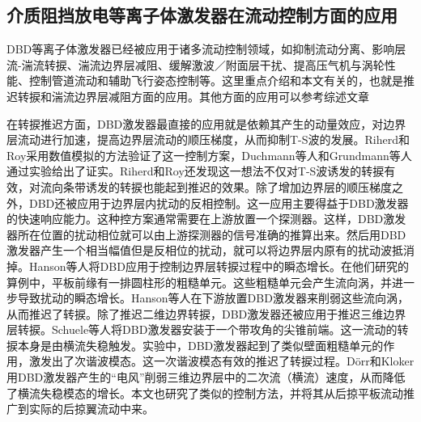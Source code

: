 \subsection{介质阻挡放电等离子体激发器在流动控制方面的应用}
DBD等离子体激发器已经被应用于诸多流动控制领域，如抑制流动分离\cite{Benard2016a,Sujar-Garrido2015,Benard2011,Benard2011a,Benard2016b,Little2010,Schneck2014,Jukes2009}、影响层流-湍流转捩\cite{Duchmann2014,Grundmann2007a,Grundmann2008,Kurz2014,Kotsonis2013,Hanson2010,Hanson2014}、湍流边界层减阻\cite{Jukes2006,Jukes2009,Mahfoze2017}、缓解激波／附面层干扰\cite{Im2012,Peschke2013}、提高压气机与涡轮性能\cite{huang2006,Ness2012}、控制管道流动\cite{Benard2008}和辅助飞行姿态控制\cite{He2009,Wei2013bang}等。这里重点介绍和本文有关的，也就是推迟转捩和湍流边界层减阻方面的应用。其他方面的应用可以参考综述文章\cite{Corke2010,wang2013Recent,wuyun2015}

在转捩推迟方面，DBD激发器最直接的应用就是依赖其产生的动量效应，对边界层流动进行加速，提高边界层流动的顺压梯度，从而抑制T-S波的发展。Riherd和Roy\cite{Riherd2013}采用数值模拟的方法验证了这一控制方案，Duchmann等人\cite{Duchmann2014,Grundmann2007a}和Grundmann等人\cite{Grundmann2007a}通过实验给出了证实。Riherd和Roy\cite{Riherd2014}还发现这一想法不仅对T-S波诱发的转捩有效，对流向条带诱发的转捩也能起到推迟的效果。除了增加边界层的顺压梯度之外，DBD还被应用于边界层内扰动的反相控制\cite{Grundmann2008,Kurz2014,Kotsonis2013,Simon2018}。这一应用主要得益于DBD激发器的快速响应能力。这种控方案通常需要在上游放置一个探测器。这样，DBD激发器所在位置的扰动相位就可以由上游探测器的信号准确的推算出来。然后用DBD激发器产生一个相当幅值但是反相位的扰动，就可以将边界层内原有的扰动波抵消掉。Hanson等人\cite{Hanson2010,Hanson2014}将DBD应用于控制边界层转捩过程中的瞬态增长。在他们研究的算例中，平板前缘有一排圆柱形的粗糙单元。这些粗糙单元会产生流向涡，并进一步导致扰动的瞬态增长。Hanson等人在下游放置DBD激发器来削弱这些流向涡，从而推迟了转捩。除了推迟二维边界转捩，DBD激发器还被应用于推迟三维边界层转捩。Schuele等人\cite{schuele2013control}将DBD激发器安装于一个带攻角的尖锥前端。这一流动的转捩本身是由横流失稳触发。实验中，DBD激发器起到了类似壁面粗糙单元的作用，激发出了次谐波模态。这一次谐波模态有效的推迟了转捩过程。D\"orr和Kloker\cite{dorr2016}用DBD激发器产生的“电风”削弱三维边界层中的二次流（横流）速度，从而降低了横流失稳模态的增长。本文也研究了类似的控制方法，并将其从后掠平板流动推广到实际的后掠翼流动中来。


